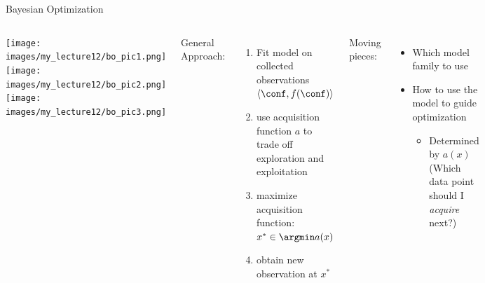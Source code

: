 \begin{frame}[c,fragile]{Bayesian Optimization }

\begin{columns}


\texttt{[image: images/my\_lecture12/bo\_pic1.png]}\\
\pause
\texttt{[image: images/my\_lecture12/bo\_pic2.png]}\\
\pause
\texttt{[image: images/my\_lecture12/bo\_pic3.png]}
\pause

General Approach:
\begin{enumerate}
  \item Fit model on collected observations $\langle{}\conf, f(\conf)\rangle{}$
  \pause
  \item use acquisition function $a$ to trade off exploration and exploitation
  \pause
  \item maximize acquisition function: $x^* \in \argmin a(x)$
  \pause
  \item obtain new observation at $x^*$
\end{enumerate}

\pause
Moving pieces:
\begin{itemize}
  	\item Which \alert{model family} to use 
	\item How to use the model to guide optimization
	\begin{itemize}
		\item Determined by $a(x)$\\
		(Which data point should I \emph{acquire} next?) 
	\end{itemize}
\end{itemize}

\end{columns}

\end{frame}

